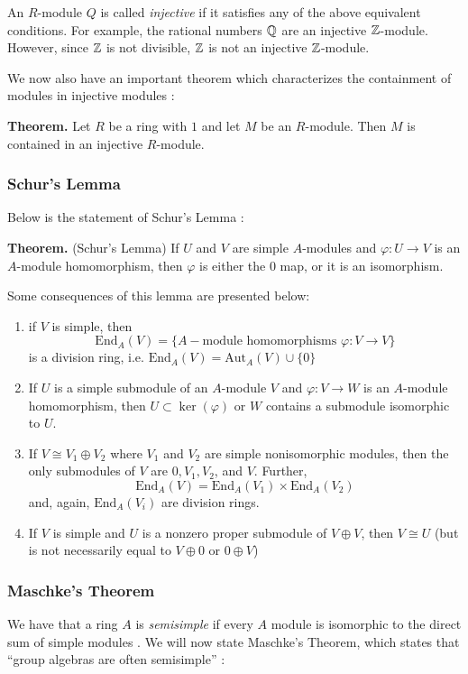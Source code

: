 \documentclass[11pt, reqno]{amsart}
\theoremstyle{plain}
\theoremstyle{definition}
\theoremstyle{example}
\def\Aut{\mathrm{Aut}}
\def\End{\mathrm{End}}
\begin{document}
An $R$-module $Q$ is called \textit{injective} if it satisfies any of the above equivalent conditions. For example, the rational numbers $\mathbb{Q}$ are an injective $\mathbb{Z}$-module. However, since $\mathbb{Z}$ is not divisible, $\mathbb{Z}$ is not an injective $\mathbb{Z}$-module.

\par
We now also have an important theorem which characterizes the containment of modules in injective modules \cite[\S 10.5, p. 398]{dummit}:

\par
\textbf{Theorem.} Let $R$ be a ring with $1$ and let $M$ be an $R$-module. Then $M$ is contained in an injective $R$-module.

\subsubsection{Schur's Lemma} Below is the statement of Schur's Lemma \cite[Lec. 15, p. 1]{dau}:

\par
\textbf{Theorem.} (Schur's Lemma) If $U$ and $V$ are simple $A$-modules and $\varphi: U \to V$ is an $A$-module homomorphism, then $\varphi$ is either the $0$ map, or it is an isomorphism.

Some consequences of this lemma are presented below:
\begin{enumerate}
\item if $V$ is simple, then $$\End_A(V) = \{A-\text{module homomorphisms } \varphi: V \to V\}$$ is a division ring, i.e. $\End_A(V) = \Aut_A(V) \cup \{0\}$

\item If $U$ is a simple submodule of an $A$-module $V$ and $\varphi: V \to W$ is an $A$-module homomorphism, then $U \subset \ker(\varphi)$ or $W$ contains a submodule isomorphic to $U$.

\item If $V \cong V_1 \oplus V_2$ where $V_1$ and $V_2$ are simple nonisomorphic modules, then the only submodules of $V$ are $0, V_1, V_2$, and $V$. Further, $$\End_A(V) = \End_A(V_1) \times \End_A(V_2)$$ and, again, $\End_A(V_i)$ are division rings.

\item If $V$ is simple and $U$ is a nonzero proper submodule of $V \oplus V$, then $V \cong U$ (but is not necessarily equal to $V \oplus 0$ or $0 \oplus V$)
\end{enumerate}

\subsubsection{Maschke's Theorem} We have that a ring $A$ is \textit{semisimple} if every $A$ module is isomorphic to the direct sum of simple modules \cite[Lec. 11, p. 1]{dau}. We will now state Maschke's Theorem, which states that ``group algebras are often semisimple'' \cite[Lec. 11, p. 2]{dau}:
\end{document}
